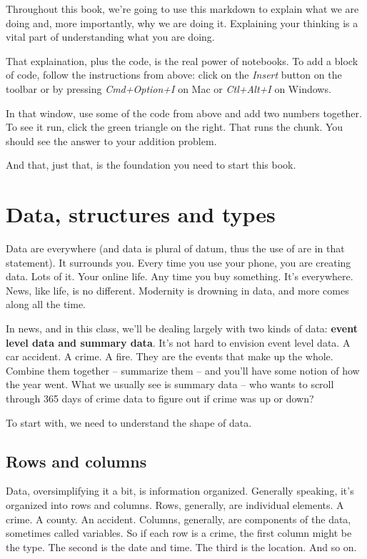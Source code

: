 \documentclass[]{book}
\begin{document}
Throughout this book, we're going to use this markdown to explain what we are doing and, more importantly, why we are doing it. Explaining your thinking is a vital part of understanding what you are doing.

That explaination, plus the code, is the real power of notebooks. To add a block of code, follow the instructions from above: click on the \emph{Insert} button on the toolbar or by pressing \emph{Cmd+Option+I} on Mac or \emph{Ctl+Alt+I} on Windows.

In that window, use some of the code from above and add two numbers together. To see it run, click the green triangle on the right. That runs the chunk. You should see the answer to your addition problem.

And that, just that, is the foundation you need to start this book.

\hypertarget{data-structures-and-types}{%
\chapter{Data, structures and types}\label{data-structures-and-types}}

Data are everywhere (and data is plural of datum, thus the use of are in that statement). It surrounds you. Every time you use your phone, you are creating data. Lots of it. Your online life. Any time you buy something. It's everywhere. News, like life, is no different. Modernity is drowning in data, and more comes along all the time.

In news, and in this class, we'll be dealing largely with two kinds of data: \textbf{event level data and summary data}. It's not hard to envision event level data. A car accident. A crime. A fire. They are the events that make up the whole. Combine them together -- summarize them -- and you'll have some notion of how the year went. What we usually see is summary data -- who wants to scroll through 365 days of crime data to figure out if crime was up or down?

To start with, we need to understand the shape of data.

\hypertarget{rows-and-columns}{%
\section{Rows and columns}\label{rows-and-columns}}

Data, oversimplifying it a bit, is information organized. Generally speaking, it's organized into rows and columns. Rows, generally, are individual elements. A crime. A county. An accident. Columns, generally, are components of the data, sometimes called variables. So if each row is a crime, the first column might be the type. The second is the date and time. The third is the location. And so on.
\end{document}
